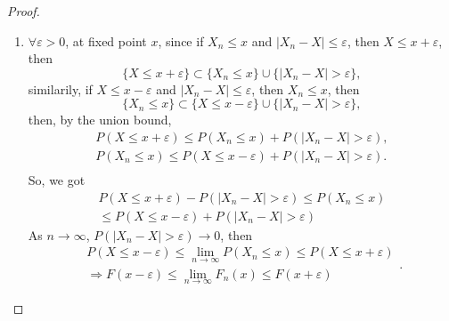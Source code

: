 \begin{proof}
    \begin{enumerate}
        \item $\forall\varepsilon>0$, at fixed point $x$, since if $X_n\leq x$ and $|X_n-X|\leq\varepsilon$, then $X\leq x+\varepsilon$, then
        \begin{equation*}
            \{X\leq x+\varepsilon\}\subset\{X_n\leq x\}\cup\{|X_n-X|>\varepsilon\},
        \end{equation*}
        similarily, if $X\leq x-\varepsilon$ and $|X_n-X|\leq\varepsilon$, then $X_n\leq x$, then
        \begin{equation*}
            \{X_n\leq x\}\subset\{X\leq x-\varepsilon\}\cup\{|X_n-X|>\varepsilon\},
        \end{equation*}
        then, by the union bound,
        \begin{equation*}
            \begin{gathered}
                P\left(X\leq x+\varepsilon\right)\leq P\left(X_n\leq x\right)+P\left(|X_n-X|>\varepsilon\right),\\
                P\left(X_n\leq x\right)\leq P\left(X\leq x-\varepsilon\right)+P\left(|X_n-X|>\varepsilon\right).\\
            \end{gathered}
        \end{equation*}
        So, we got
        \begin{equation*}
            \begin{gathered}
                P\left(X\leq x+\varepsilon\right)-P\left(|X_n-X|>\varepsilon\right)\leq P\left(X_n\leq x\right) \\
                \leq P\left(X\leq x-\varepsilon\right)+P\left(|X_n-X|>\varepsilon\right)
            \end{gathered}
        \end{equation*}
        As $n\rightarrow\infty$, $P\left(|X_n-X|>\varepsilon\right)\rightarrow 0$, then
        \begin{equation*}
            \begin{gathered}
                P\left(X\leq x-\varepsilon\right)\leq\lim_{n\rightarrow\infty}P\left(X_n\leq x\right)\leq P\left(X\leq x+\varepsilon\right) \\
                \Rightarrow F(x-\varepsilon)\leq \lim_{n\rightarrow\infty}F_n(x)\leq F(x+\varepsilon)
            \end{gathered}.
        \end{equation*}

\end{enumerate}
\end{proof}
